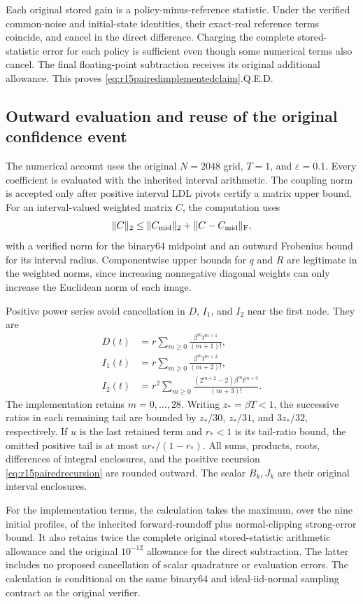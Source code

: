 Each original stored gain is a policy-minus-reference statistic. Under the
verified common-noise and initial-state identities, their exact-real
reference terms coincide, and cancel in the direct difference. Charging
the complete stored-statistic error for each policy is sufficient even
though some numerical terms also cancel. The final floating-point
subtraction receives its original additional allowance. This proves
\eqref{eq:r15pairedimplementedclaim}.\hfill Q.E.D.

\subsection{Outward evaluation and reuse of the original confidence event}

The numerical account uses the original $N=2048$ grid, $T=1$, and
$\varepsilon=0.1$. Every coefficient is evaluated with the inherited
interval arithmetic. The coupling norm is accepted only after positive
interval LDL pivots certify a matrix upper bound. For an interval-valued
weighted matrix $C$, the computation uses
\[
 \|C\|_2\leq\|C_{\rm mid}\|_2+\|C-C_{\rm mid}\|_{\rm F},
\]
with a verified norm for the binary64 midpoint and an outward Frobenius
bound for its interval radius. Componentwise upper bounds for $q$ and
$R$ are legitimate in the weighted norms, since increasing nonnegative
diagonal weights can only increase the Euclidean norm of each image.

Positive power series avoid cancellation in $D$, $I_1$, and $I_2$ near
the first node. They are
\begin{align*}
 D(t)&=r\sum_{m\geq0}\frac{\beta^m t^{m+1}}{(m+1)!},\\
 I_1(t)&=r\sum_{m\geq0}\frac{\beta^m t^{m+2}}{(m+2)!},\\
 I_2(t)&=r^2\sum_{m\geq0}
           \frac{(2^{m+2}-2)\beta^m t^{m+3}}{(m+3)!}.
\end{align*}
The implementation retains $m=0,\ldots,28$.
Writing $z_*=\beta T<1$, the successive ratios in each remaining tail
are bounded by
$z_*/30$, $z_*/31$, and $3z_*/32$, respectively.
If $u$ is the last retained term and $r_*<1$ is its tail-ratio bound,
the omitted positive tail is at most $ur_*/(1-r_*)$.
All sums, products, roots, differences of integral enclosures, and the
positive recursion \eqref{eq:r15pairedrecursion} are rounded outward.
The scalar $B_k,J_k$ are their original interval enclosures.

For the implementation terms, the calculation takes the maximum, over the
nine initial profiles, of the inherited forward-roundoff plus
normal-clipping strong-error bound. It also retains twice the complete
original stored-statistic arithmetic allowance and the original
$10^{-12}$ allowance for the direct subtraction. The latter includes
no proposed cancellation of scalar quadrature or evaluation errors.
The calculation is conditional on the same binary64 and ideal-iid-normal
sampling contract as the original verifier.

